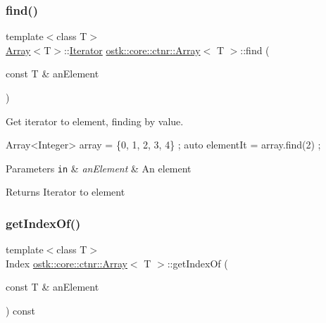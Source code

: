 \subsubsection{\texorpdfstring{find()}{find()}\hspace{0.1cm}{\footnotesize\ttfamily [2/2]}}
{\footnotesize\ttfamily template$<$class T$>$ \\
\hyperlink{classostk_1_1core_1_1ctnr_1_1_array}{Array}$<$T$>$\+::\hyperlink{classostk_1_1core_1_1ctnr_1_1_array_accf81dc56e553dad2ce7b72802836c46}{Iterator} \hyperlink{classostk_1_1core_1_1ctnr_1_1_array}{ostk\+::core\+::ctnr\+::\+Array}$<$ T $>$\+::find (\begin{DoxyParamCaption}\item[{const T \&}]{an\+Element }\end{DoxyParamCaption})}



Get iterator to element, finding by value. 


\begin{DoxyCode}
Array<Integer> array = \{0, 1, 2, 3, 4\} ;
\textcolor{keyword}{auto} elementIt = array.find(2) ;
\end{DoxyCode}



\begin{DoxyParams}[1]{Parameters}
\mbox{\tt in}  & {\em an\+Element} & An element \\
\hline
\end{DoxyParams}
\begin{DoxyReturn}{Returns}
Iterator to element 
\end{DoxyReturn}
\mbox{\label{classostk_1_1core_1_1ctnr_1_1_array_a15962a36fd2a4fc1e972a1b68ff7c170}} 
\subsubsection{\texorpdfstring{get\+Index\+Of()}{getIndexOf()}}
{\footnotesize\ttfamily template$<$class T$>$ \\
Index \hyperlink{classostk_1_1core_1_1ctnr_1_1_array}{ostk\+::core\+::ctnr\+::\+Array}$<$ T $>$\+::get\+Index\+Of (\begin{DoxyParamCaption}\item[{const T \&}]{an\+Element }\end{DoxyParamCaption}) const}



